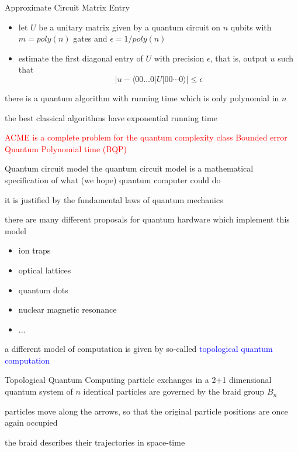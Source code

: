 \documentclass{prosper}
\renewcommand{\>}{\rangle}
\newcommand{\<}{\langle}
\begin{document}
\begin{slide}{Approximate Circuit Matrix Entry}
\begin{itemize}
\item let $U$ be a unitary matrix given by a quantum circuit on $n$ qubits with $m=poly(n)$ gates
and $\epsilon=1/poly(n)$
\item estimate the first diagonal entry of $U$ with precision $\epsilon$, that is, output $u$ such that
\[
|u-\<00\ldots 0|U|00\cdots 0\>|\le \epsilon
\]
\end{itemize}
there is a quantum algorithm with running time which is only polynomial in $n$

\medskip
the best classical algorithms have exponential running time

\medskip \textcolor{red}{ACME is a complete problem for the quantum complexity class Bounded error Quantum Polynomial time (BQP)}
\end{slide}


\begin{slide}{Quantum circuit model}
the quantum circuit model is a mathematical specification of what (we hope) quantum computer could do 

\medskip
it is justified by the fundamental laws of quantum mechanics

\medskip
there are many different proposals for quantum hardware which implement this model
\begin{itemize}
\item ion traps
\item optical lattices
\item quantum dots
\item nuclear magnetic resonance
\item ...
\end{itemize}
a different model of computation is given by so-called \textcolor{blue}{topological quantum computation}
\end{slide}


\begin{slide}{Topological Quantum Computing}
particle exchanges in a 2+1 dimensional quantum system of $n$
identical particles are governed by the braid group $B_n$

\medskip
\quad{}\textwidth{}

particles move along the arrows, so that the original particle
positions are once again occupied

\medskip
the braid describes their trajectories in space-time

\end{slide}
\end{document}
